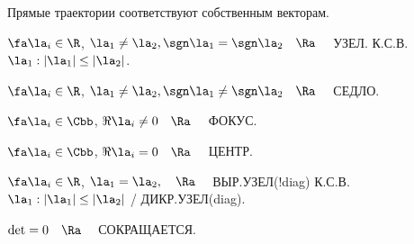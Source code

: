 \documentclass[a4paper]{article}
\newcommand{\qu}{\quad}
\begin{document}
Прямые траектории соответствуют собственным векторам.

$\fa \la_i \in \R$, $\la_1\neq \la_2, \sgn \la_1 = \sgn \la_2 \qu \Ra \qu$ УЗЕЛ. К.С.В. $\la_1: |\la_1| \le |\la_2|$.

$\fa \la_i \in \R$, $\la_1\neq \la_2, \sgn \la_1 \neq \sgn \la_2 \qu \Ra \qu$ СЕДЛО.

$\fa \la_i \in \Cbb$, $\Re \la_i \neq 0 \qu \Ra \qu$ ФОКУС.

$\fa \la_i \in \Cbb$, $\Re \la_i = 0 \qu \Ra \qu$ ЦЕНТР.

$\fa \la_i \in \R$, $\la_1=\la_2, \qu \Ra \qu$ ВЫР.УЗЕЛ(!diag) К.С.В. $\la_1: |\la_1| \le |\la_2|$ / ДИКР.УЗЕЛ(diag).

$\det = 0 \qu \Ra \qu$ СОКРАЩАЕТСЯ.
\end{document}
